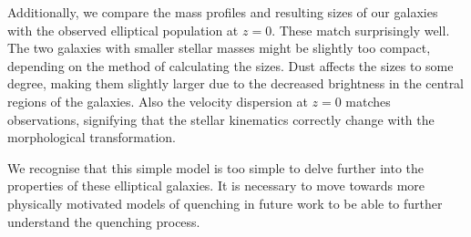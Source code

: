 \documentclass[useAMS,usenatbib]{mnras}
\begin{document}
Additionally, we compare the mass profiles and resulting sizes of our
galaxies with the observed elliptical population at $z=0$. These match
surprisingly well. The two galaxies with smaller stellar masses might be
slightly too compact, depending on the method of calculating the
sizes. {Dust affects the sizes to some degree, making them
  slightly larger due to the decreased brightness in the central
  regions of the galaxies.} Also the velocity dispersion at $z=0$ matches observations,
signifying that the stellar kinematics correctly change with the
morphological transformation. 

We recognise that this simple model is too simple to delve further
into the properties of these elliptical galaxies. It is
necessary to move towards more physically motivated models of
quenching in future work to be able to further understand the
quenching process. 

\end{document}

